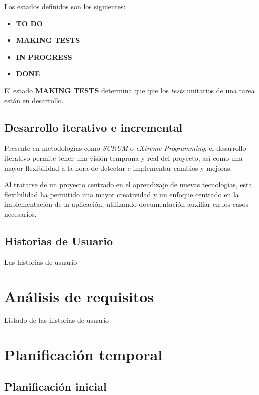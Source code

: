 \documentclass[10pt, a4paper]{aqademic}
\begin{document}
\medskip

Los estados definidos son los siguientes:

\begin{itemize}
	\item \textbf{TO DO}
	\item \textbf{MAKING TESTS}
	\item \textbf{IN PROGRESS}
	\item \textbf{DONE} 
\end{itemize}

El estado \textbf{MAKING TESTS} determina que que los \textit{tests} unitarios de una tarea están en desarrollo.


\subsection*{Desarrollo iterativo e incremental}

Presente en metodologías como \textit{SCRUM} o \textit{eXtreme Programming}, el desarrollo iterativo permite tener una visión temprana y real del proyecto, así como una mayor flexibilidad a la hora de detectar e implementar cambios y mejoras.

\medskip

Al tratarse de un proyecto centrado en el aprendizaje de nuevas tecnologías, esta flexibilidad ha permitido una mayor creatividad y un enfoque centrado en la implementación de la aplicación, utilizando documentación auxiliar en los casos necesarios.


\subsection*{Historias de Usuario}

Las historias de usuario


\section{Análisis de requisitos}

Listado de las historias de usuario

\section{Planificación temporal}

\subsection{Planificación inicial}
\end{document}
